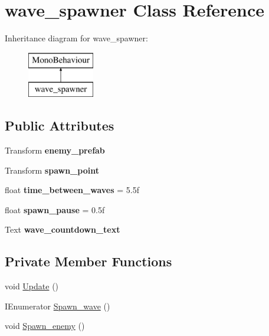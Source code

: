 \hypertarget{classwave__spawner}{}\section{wave\+\_\+spawner Class Reference}
\label{classwave__spawner}
Inheritance diagram for wave\+\_\+spawner\+:\begin{figure}[H]
\begin{center}
\leavevmode
\includegraphics[height=2.000000cm]{classwave__spawner}
\end{center}
\end{figure}
\subsection*{Public Attributes}
\begin{DoxyCompactItemize}
\item 
\mbox{\label{classwave__spawner_ab4dc5725df6456980068ee94a159d361}} 
Transform {\bfseries enemy\+\_\+prefab}
\item 
\mbox{\label{classwave__spawner_a1b18aba1e910346fb16de96894d3d4fa}} 
Transform {\bfseries spawn\+\_\+point}
\item 
\mbox{\label{classwave__spawner_abbc823be2179bae1976ed1751abf9c15}} 
float {\bfseries time\+\_\+between\+\_\+waves} = 5.\+5f
\item 
\mbox{\label{classwave__spawner_a5a53cfa452310466ba0770f00c2911a5}} 
float {\bfseries spawn\+\_\+pause} = 0.\+5f
\item 
\mbox{\label{classwave__spawner_a7fed1f46da7e53b59badb80c26e0941c}} 
Text {\bfseries wave\+\_\+countdown\+\_\+text}
\end{DoxyCompactItemize}
\subsection*{Private Member Functions}
\begin{DoxyCompactItemize}
\item 
void \hyperlink{classwave__spawner_ae049116b14cb20519c1c5a2dc2b824d8}{Update} ()
\item 
I\+Enumerator \hyperlink{classwave__spawner_ad77dc8cd1dbf901d7be2336b5768829e}{Spawn\+\_\+wave} ()
\item 
void \hyperlink{classwave__spawner_a21e2893023c0716bee2f0811eaee7fa2}{Spawn\+\_\+enemy} ()
\end{DoxyCompactItemize}
